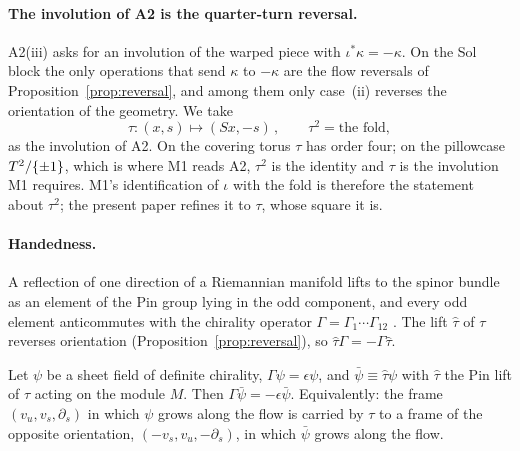 \paragraph{The involution of A2 is the quarter-turn reversal.}
A2(iii) asks for an involution of the warped piece with $\iota^{*}\kappa=-\kappa$.
On the Sol block the only operations that send $\kappa$ to $-\kappa$ are the
flow reversals of Proposition~\ref{prop:reversal}, and among them only
case~(ii) reverses the orientation of the geometry. We take
\begin{equation}\label{eq:tau}
  \tau:(x,s)\longmapsto(Sx,-s)\,,\qquad \tau^{2}=\text{the fold},
\end{equation}
as the involution of A2. On the covering torus $\tau$ has order four; on the
pillowcase $T^2/\{\pm1\}$, which is where M1 reads A2, $\tau^{2}$ is the
identity and $\tau$ is the involution M1 requires. M1's identification of
$\iota$ with the fold is therefore the statement about $\tau^{2}$; the present
paper refines it to $\tau$, whose square it is. \rigD

\paragraph{Handedness.}
A reflection of one direction of a Riemannian manifold lifts to the spinor
bundle as an element of the Pin group lying in the odd component, and every
odd element anticommutes with the chirality operator
$\Gamma=\Gamma_{1}\cdots\Gamma_{12}$ \cite{LawsonMichelsohn}. The lift
$\hat\tau$ of $\tau$ reverses orientation (Proposition~\ref{prop:reversal}),
so $\hat\tau\Gamma=-\Gamma\hat\tau$.

\begin{theorem}\label{thm:handedness}
Let $\psi$ be a sheet field of definite chirality, $\Gamma\psi=\epsilon\psi$,
and $\bar\psi\equiv\hat\tau\psi$ with $\hat\tau$ the Pin lift of $\tau$ acting on
the module $M$. Then $\Gamma\bar\psi=-\epsilon\bar\psi$.
Equivalently: the frame $(v_{u},v_{s},\partial_{s})$ in which $\psi$ grows
along the flow is carried by $\tau$ to a frame of the opposite orientation,
$(-v_{s},v_{u},-\partial_{s})$, in which $\bar\psi$ grows along the flow.
\end{theorem}


